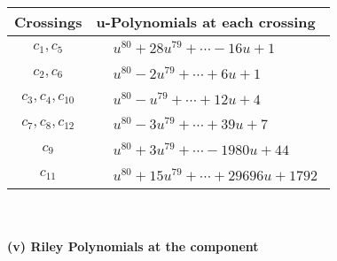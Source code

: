 \documentclass[1p]{elsarticle_modified}
\theoremstyle{definition}
\begin{document}
\begin{tabular}{m{50pt}|m{274pt}}
Crossings & \hspace{64pt}u-Polynomials at each crossing \\
\hline $$\begin{aligned}c_{1},c_{5}\end{aligned}$$&$\begin{aligned}
&u^{80}+28 u^{79}+\cdots-16 u+1
\end{aligned}$\\
\hline $$\begin{aligned}c_{2},c_{6}\end{aligned}$$&$\begin{aligned}
&u^{80}-2 u^{79}+\cdots+6 u+1
\end{aligned}$\\
\hline $$\begin{aligned}c_{3},c_{4},c_{10}\end{aligned}$$&$\begin{aligned}
&u^{80}- u^{79}+\cdots+12 u+4
\end{aligned}$\\
\hline $$\begin{aligned}c_{7},c_{8},c_{12}\end{aligned}$$&$\begin{aligned}
&u^{80}-3 u^{79}+\cdots+39 u+7
\end{aligned}$\\
\hline $$\begin{aligned}c_{9}\end{aligned}$$&$\begin{aligned}
&u^{80}+3 u^{79}+\cdots-1980 u+44
\end{aligned}$\\
\hline $$\begin{aligned}c_{11}\end{aligned}$$&$\begin{aligned}
&u^{80}+15 u^{79}+\cdots+29696 u+1792
\end{aligned}$\\
\hline
\end{tabular}\\~\\
\newpage\renewcommand{\arraystretch}{1}
\flushleft \textbf{(v) Riley Polynomials at the component}\newline \\
\end{document}

